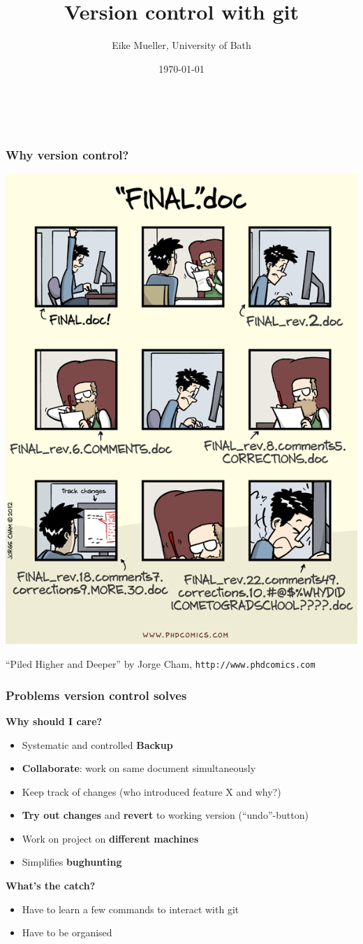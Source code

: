\documentclass{beamer}
\begin{document}
\title{Version control with git}
\author{Eike Mueller, University of Bath}
\date{\today} 


\begin{frame}
  \frametitle{$ $}
  \titlepage
\end{frame}


\begin{frame}
  \frametitle{Why version control?}
  \begin{center}
    \includegraphics[width=0.5\linewidth]{phdcomics.png}
  \end{center}
  {\footnotesize ``Piled Higher and Deeper'' by Jorge Cham, \texttt{http://www.phdcomics.com}}
\end{frame}


\begin{frame}
  \frametitle{Problems version control solves}
  \textbf{\large Why should I care?}
  \begin{itemize}
  \item Systematic and controlled \textbf{Backup}
  \item \textbf{Collaborate}: work on same document simultaneously
  \item Keep track of changes (who introduced feature X and why?)
  \item \textbf{Try out changes} and \textbf{revert} to working version (``undo''-button)
  \item Work on project on \textbf{different machines}
  \item Simplifies \textbf{bughunting}
  \end{itemize}
  \vspace{2ex}
  \textbf{\large What's the catch?}
  \begin{itemize}
    \item Have to learn a few commands to interact with git
    \item Have to be organised
  \end{itemize}
\end{frame}
\end{document}
